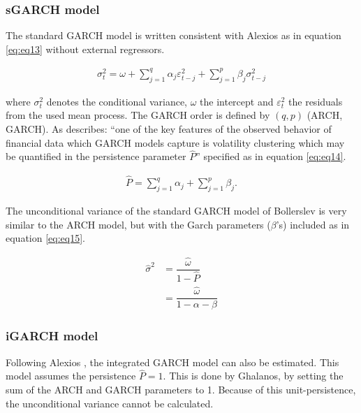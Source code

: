\documentclass[a4paper, twoside]{templates/ociamthesis}
\begin{document}
\hypertarget{sgarch-model}{%
\subsubsection{sGARCH model}\label{sgarch-model}}

The standard GARCH model \autocite{bollerslev1986} is written consistent with Alexios \textcite{ghalanos2020} as in equation \eqref{eq:eq13} without external regressors.

\begin{align}
\sigma_t^2 = \omega  + \sum\limits_{j = 1}^q {{\alpha_j}\varepsilon _{t-j}^2 +} \sum\limits_{j=1}^p {{\beta_j}\sigma_{t-j}^2} 
 \label{eq:eq13}
\end{align}

where \(\sigma_t^2\) denotes the conditional variance, \(\omega\) the intercept and \(\varepsilon_t^2\) the residuals from the used mean process. The GARCH order is defined by \((q, p)\) (ARCH, GARCH). As \textcite{ghalanos2020} describes: ``one of the key features of the observed behavior of financial data which GARCH models capture is volatility clustering which may be quantified in the persistence parameter \(\hat{P}\)'' specified as in equation \eqref{eq:eq14}.

\begin{align}
\hat{P} = \sum\limits_{j = 1}^q {{\alpha_j}}  + \sum\limits_{j = 1}^p {{\beta_j}}.
 \label{eq:eq14}
\end{align}

The unconditional variance of the standard GARCH model of Bollerslev is very similar to the ARCH model, but with the Garch parameters (\(\beta\)'s) included as in equation \eqref{eq:eq15}.

\begin{equation}
\begin{split}
\hat{\sigma}^2 
&= \dfrac{\hat{\omega}}{1 - \hat{P}} \\
&= \dfrac{\hat{\omega}}{1 - \alpha - \beta}
\end{split}
 \label{eq:eq15}
\end{equation}

\hypertarget{igarch-model}{%
\subsubsection{iGARCH model}\label{igarch-model}}

Following Alexios \textcite{ghalanos2020}, the integrated GARCH model \autocite{bollerslev1986} can also be estimated. This model assumes the persistence \(\hat{P} = 1\). This is done by Ghalanos, by setting the sum of the ARCH and GARCH parameters to 1. Because of this unit-persistence, the unconditional variance cannot be calculated.
\end{document}
